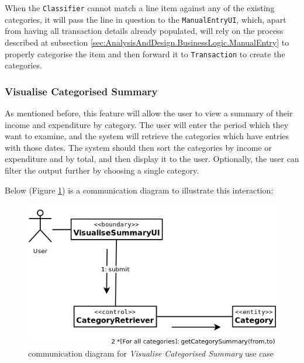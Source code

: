 When the \texttt{Classifier} cannot match a line item against any of the existing
categories, it will pass the line in question to the \texttt{ManualEntryUI},
which, apart from having all transaction details already populated, will rely
on the process described at subsection \ref{sec:AnalysisAndDesign.BusinessLogic.ManualEntry}
to properly categorise the item and then forward it to \texttt{Transaction} to
create the categories.

\subsubsection{Visualise Categorised Summary} \label{sec:AnalysisAndDesign.BusinessLogic.ViewSummary}
As mentioned before, this feature will allow the user to view a summary of
their income and expenditure by category.  The user will enter the period which
they want to examine, and the system will retrieve the categories which have
entries with those dates.  The system should then sort the categories by income
or expenditure and by total, and then display it to the user. Optionally, the
user can filter the output further by choosing a single category.

Below (Figure \ref{fig:CommDiagram.VisualiseCategorisedSummary}) is a
communication diagram to illustrate this interaction: 
\begin{figure}[ht!]
  \begin{center}
    \includegraphics[width=12cm]{./contents/img/Comm_Diagram_-_Visualise_Categorised_Summary.png}
  \end{center}
  \caption{communication diagram for \emph{Visualise Categorised Summary} use case}
  \label{fig:CommDiagram.VisualiseCategorisedSummary}
\end{figure}
\FloatBarrier



